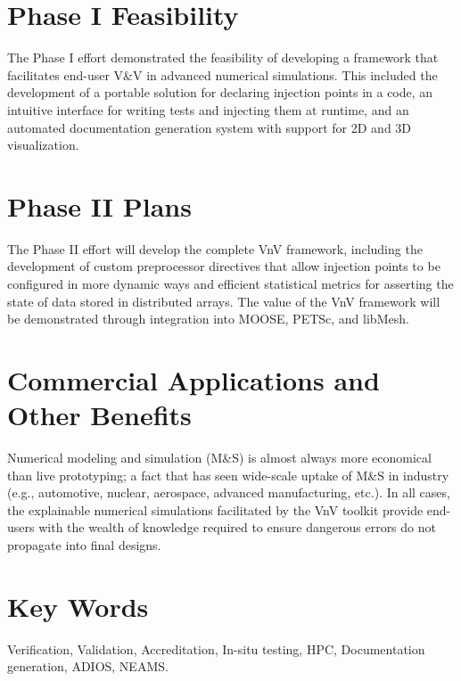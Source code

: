 \section*{Phase I Feasibility}
The Phase I effort demonstrated the feasibility of developing a framework that facilitates end-user V\&V
in advanced numerical simulations. This included the development of 
a portable solution for declaring injection points in a code, an intuitive interface 
for writing tests and injecting them at runtime, and an automated documentation generation
system with support for 2D and 3D visualization. 

\section*{Phase II Plans}
The Phase II effort will develop the complete VnV framework, including the development
of custom preprocessor directives that allow injection points to be configured in more dynamic ways 
and efficient statistical metrics for asserting the state of data 
stored in distributed arrays. The value of the VnV framework will be demonstrated through integration
into MOOSE, PETSc, and libMesh. 

\section*{Commercial Applications and Other Benefits}
Numerical modeling and simulation (M\&S) is almost always more economical than live prototyping; 
a fact that has seen wide-scale uptake of M\&S in industry (e.g., automotive, nuclear, 
aerospace, advanced manufacturing, etc.). In all cases, the explainable numerical simulations facilitated
by the VnV toolkit provide end-users with the wealth of knowledge required to ensure dangerous errors
do not propagate into final designs. 

\section*{Key Words}
Verification, Validation, Accreditation, In-situ testing,
HPC, Documentation generation, ADIOS, NEAMS.

